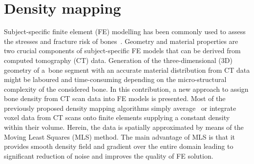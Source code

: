 \documentclass[11pt]{acmeArticle}
\numberwithin{equation}{section}
\begin{document}
\section{Density mapping}
\label{sec:dens_mapping}
Subject-specific finite element (FE) modelling has been commonly used to assess the stresses and fracture risk of bones~\citep{poelert2013patient,Helgason2008b,Yosibash2010}. 
Geometry and material properties are two crucial components of subject-specific FE models that can be derived from computed tomography (CT) data. 
Generation of the three-dimensional (3D) geometry of a~bone segment with an accurate material distribution from CT data might be laboured and time-consuming depending on the micro-structural complexity of the considered bone. 
In this contribution, a new approach to assign bone density from CT scan data into FE models is presented. 
Most of the previously proposed density mapping algorithms simply average~\citep{zannoni1999material} or integrate~\citep{taddei2007material, schileo2008subject} voxel data from CT scans onto finite elements supplying a constant density within their volume. 
Herein, the data is spatially approximated by means of the Moving Least Squares (MLS) method. 
The main advantage of MLS is that it provides smooth density field and gradient over the entire domain leading to significant reduction of noise and improves the quality of FE solution. 
\end{document}
